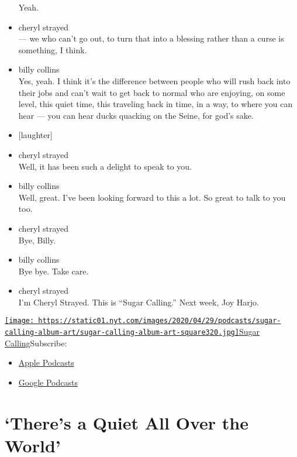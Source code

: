 \begin{itemize}
  Yeah.
\item
  cheryl strayed\\
  --- we who can't go out, to turn that into a blessing rather than a
  curse is something, I think.
\item
  billy collins\\
  Yes, yeah. I think it's the difference between people who will rush
  back into their jobs and can't wait to get back to normal who are
  enjoying, on some level, this quiet time, this traveling back in time,
  in a way, to where you can hear --- you can hear ducks quacking on the
  Seine, for god's sake.
\item
  {[}laughter{]}
\item
  cheryl strayed\\
  Well, it has been such a delight to speak to you.
\item
  billy collins\\
  Well, great. I've been looking forward to this a lot. So great to talk
  to you too.
\item
  cheryl strayed\\
  Bye, Billy.
\item
  billy collins\\
  Bye bye. Take care.
\item
  cheryl strayed\\
  I'm Cheryl Strayed. This is ``Sugar Calling.'' Next week, Joy Harjo.
\end{itemize}

\href{https://www.nytimes.com/column/sugar-calling}{\texttt{[image: https://static01.nyt.com/images/2020/04/29/podcasts/sugar-calling-album-art/sugar-calling-album-art-square320.jpg]}Sugar
Calling}Subscribe:

\begin{itemize}
\tightlist
\item
  \href{https://itunes.apple.com/us/podcast/id1505881384}{Apple
  Podcasts}
\item
  \href{https://podcasts.google.com/?feed=aHR0cHM6Ly9yc3MuYXJ0MTkuY29tL3N1Z2FyLWNhbGxpbmc\&ved=0CAUQrrcFahcKEwjA8Kyn09voAhUAAAAAHQAAAAAQBQ}{Google
  Podcasts}
\end{itemize}

\hypertarget{theres-a-quiet-all-over-the-world-1}{%
\section{`There's a Quiet All Over the
World'}\label{theres-a-quiet-all-over-the-world-1}}

